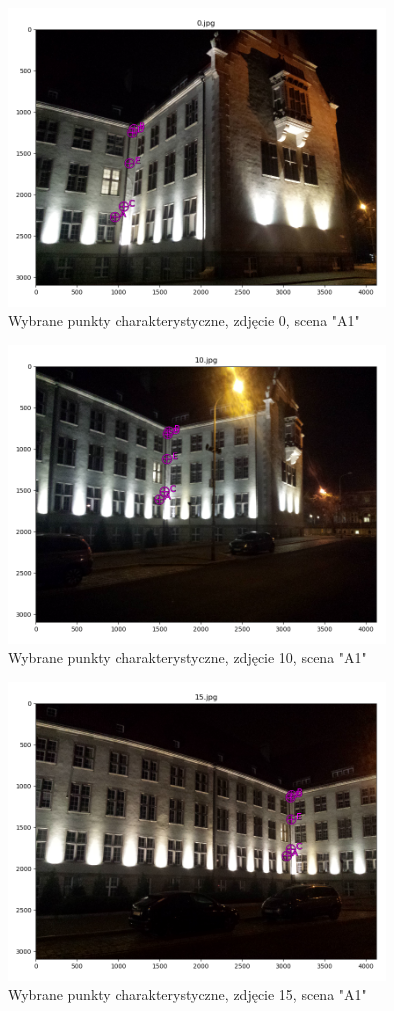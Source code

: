 \begin{figure}[h]
   \centering
   \includegraphics[width=10cm]{feature_A1/img_0.png}
   \caption{Wybrane punkty charakterystyczne, zdjęcie 0, scena "A1"}
   \label {fig:feature_A1_img_0}
\end{figure}
\begin{figure}[h]
   \centering
   \includegraphics[width=10cm]{feature_A1/img_10.png}
   \caption{Wybrane punkty charakterystyczne, zdjęcie 10, scena "A1"}
   \label {fig:feature_A1_img_10}
\end{figure}
\begin{figure}[h]
   \centering
   \includegraphics[width=10cm]{feature_A1/img_15.png}
   \caption{Wybrane punkty charakterystyczne, zdjęcie 15, scena "A1"}
   \label {fig:feature_A1_img_15}
\end{figure}

